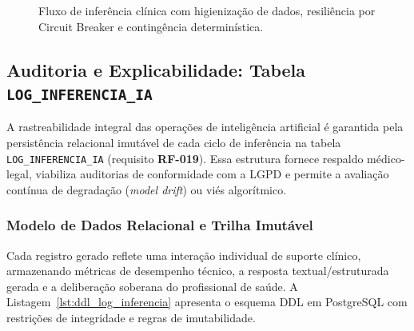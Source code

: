 \begin{figure}[H]
    \caption{Fluxo de inferência clínica com higienização de dados, resiliência por Circuit Breaker e contingência determinística.}
    \label{fig:fluxo_ia_resiliencia}
\end{figure}

\subsection{Auditoria e Explicabilidade: Tabela \texttt{LOG\_INFERENCIA\_IA}}
\label{subsec:ia_auditoria}

A rastreabilidade integral das operações de inteligência artificial é garantida pela persistência relacional imutável de cada ciclo de inferência na tabela \texttt{LOG\_INFERENCIA\_IA} (requisito \textbf{RF-019}). Essa estrutura fornece respaldo médico-legal, viabiliza auditorias de conformidade com a LGPD e permite a avaliação contínua de degradação (\textit{model drift}) ou viés algorítmico.

\subsubsection{Modelo de Dados Relacional e Trilha Imutável}
Cada registro gerado reflete uma interação individual de suporte clínico, armazenando métricas de desempenho técnico, a resposta textual/estruturada gerada e a deliberação soberana do profissional de saúde. A Listagem~\ref{lst:ddl_log_inferencia} apresenta o esquema DDL em PostgreSQL com restrições de integridade e regras de imutabilidade.

